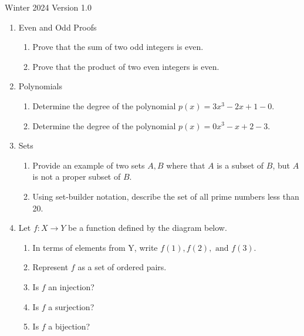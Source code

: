 \documentclass[12pt]{article}
\begin{document}
\begin{flushright}Winter 2024 Version 1.0\end{flushright}

\begin{enumerate}[itemsep=1em]

\item{Even and Odd Proofs}
\begin{enumerate}
    \item Prove that the sum of two odd integers is even.
    \item Prove that the product of two even integers is even.
\end{enumerate}

\item{Polynomials}
\begin{enumerate}
    \item Determine the degree of the polynomial $p(x) = 3x^3 - 2x + 1 - 0$.
    \item Determine the degree of the polynomial $p(x) = 0x^3 - x + 2 -3$.
\end{enumerate}

\item{Sets}
\begin{enumerate}
    \item Provide an example of two sets $A, B$ where that $A$ is a subset of $B$, but $A$ is not a proper subset of $B$.
    \item Using set-builder notation, describe the set of all prime numbers less than 20.
\end{enumerate}

\item{Let $f : X \rightarrow Y$ be a function defined by the
    diagram below. 


    \begin{enumerate}
        \item In terms of elements from Y, write $f(1), f(2), \text{ and } f(3)$.
        \item Represent $f$ as a set of ordered pairs.
        \item Is $f$ an injection?
        \item Is $f$ a surjection?
        \item Is $f$ a bijection?
    \end{enumerate}
    }


\end{enumerate}
\end{document}
